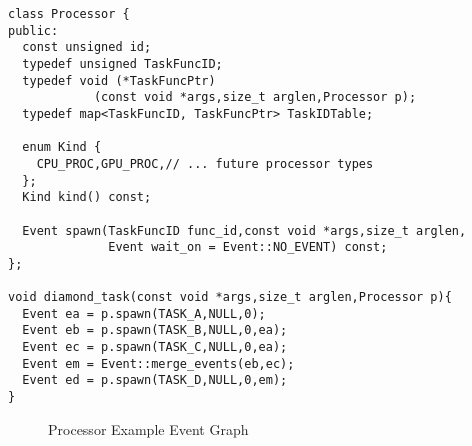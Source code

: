 \begin{lstlisting}[float={t},label={lst:procapi},caption={Processor Interface and Example.}]
class Processor {
public:
  const unsigned id;
  typedef unsigned TaskFuncID;
  typedef void (*TaskFuncPtr)
            (const void *args,size_t arglen,Processor p);
  typedef map<TaskFuncID, TaskFuncPtr> TaskIDTable;

  enum Kind {
    CPU_PROC,GPU_PROC,// ... future processor types
  };
  Kind kind() const;

  Event spawn(TaskFuncID func_id,const void *args,size_t arglen,
              Event wait_on = Event::NO_EVENT) const;
};

void diamond_task(const void *args,size_t arglen,Processor p){
  Event ea = p.spawn(TASK_A,NULL,0);
  Event eb = p.spawn(TASK_B,NULL,0,ea);
  Event ec = p.spawn(TASK_C,NULL,0,ea);
  Event em = Event::merge_events(eb,ec);
  Event ed = p.spawn(TASK_D,NULL,0,em);
}
\end{lstlisting}

\begin{figure}
\centering
{}
\caption{Processor Example Event Graph\label{fig:procevents}}
\end{figure}


